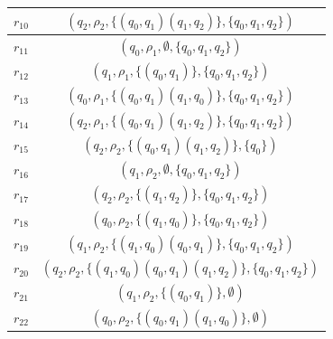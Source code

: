 {\begin{table}[t]
\begin{tabular}{|c|c|}
                        \hline
                        $r_{10}$ & $(q_2, \rho_2, \{ (q_0, q_1) (q_1, q_2) \}, \{ q_0, q_1, q_2 \})$\\
                        \hline
                        $r_{11}$ & $(q_0, \rho_1, \emptyset, \{ q_0, q_1, q_2 \})$\\
                        \hline
                        $r_{12}$ & $(q_1, \rho_1, \{ (q_0, q_1) \}, \{ q_0, q_1, q_2 \})$\\
                        \hline
                        $r_{13}$ & $(q_0, \rho_1, \{ (q_0, q_1) (q_1, q_0) \}, \{ q_0, q_1, q_2 \})$\\
                        \hline
                        $r_{14}$ & $(q_2, \rho_1, \{ (q_0, q_1) (q_1, q_2) \}, \{ q_0, q_1, q_2 \})$\\
                        \hline
                        $r_{15}$ & $(q_2, \rho_2, \{ (q_0, q_1) (q_1, q_2) \}, \{ q_0 \})$\\
                        \hline
                        $r_{16}$ & $(q_1, \rho_2, \emptyset, \{ q_0, q_1, q_2 \})$\\
                        \hline
                        $r_{17}$ & $(q_2, \rho_2, \{ (q_1, q_2) \}, \{ q_0, q_1, q_2 \})$\\
                        \hline
                        $r_{18}$ & $(q_0, \rho_2, \{ (q_1, q_0) \}, \{ q_0, q_1, q_2 \})$\\
                        \hline
                        $r_{19}$ & $(q_1, \rho_2, \{ (q_1, q_0) (q_0, q_1) \}, \{ q_0, q_1, q_2 \})$\\
                        \hline
                        $r_{20}$ & $(q_2, \rho_2, \{ (q_1, q_0) (q_0, q_1) (q_1, q_2) \}, \{ q_0, q_1, q_2 \})$\\
                        \hline
                        $r_{21}$ & $(q_1, \rho_2, \{ (q_0, q_1) \}, \emptyset)$\\
                        \hline
                        $r_{22}$ & $(q_0, \rho_2, \{ (q_0, q_1) (q_1, q_0) \}, \emptyset)$\\
                        \hline
                    \end{tabular}
                \end{table}
                }


